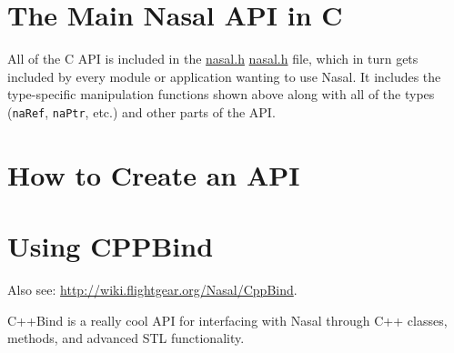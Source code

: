 \documentclass{article}
\newcommand{\type}[1]{\textcolor{type}{\tt #1}}
\newcommand{\nasalsourcefile}[2][]{%
  \ifthenelse{\isempty{#1}}%
    {%
      \textcolor{source}{%
        \href{https://github.com/andyross/nasal/blob/master/src/#2}{#2}%
      }%
    }%
    {%
      \textcolor{source}{%
        \href{https://github.com/andyross/nasal/blob/master/src/#2\#L#1}{#2}%
      }%
    }%
}
\begin{document}
\section{The Main Nasal API in C}
All of the C API is included in the \nasalsourcefile{nasal.h} file, which in turn gets included by every module or application wanting to use Nasal.  It includes the type-specific manipulation functions shown above along with all of the types (\type{naRef}, \type{naPtr}, etc.) and other parts of the API.


\section{How to Create an API}
\section{Using CPPBind}
Also see: \url{http://wiki.flightgear.org/Nasal/CppBind}.

C++Bind is a really cool API for interfacing with Nasal through C++ classes, methods, and advanced STL functionality.
\end{document}
